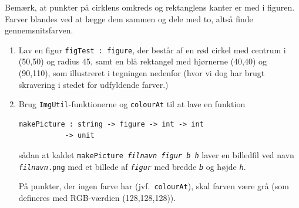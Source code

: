 \documentclass[a4paper,12pt]{article}
\begin{document}
\begin{enumerate}[label=8ø.\arabic*,start=0]
\noindent
Bemærk, at punkter på cirklens omkreds og rektanglens kanter er med i
figuren.  Farver blandes ved at lægge dem sammen og dele med to, altså
finde gennemsnitsfarven.

\begin{enumerate}[label=7ø.\arabic*,start=7]

\item Lav en figur \texttt{figTest : figure}, der består af en rød cirkel
  med centrum i (50,50) og radius 45, samt en blå rektangel med
  hjørnerne (40,40) og (90,110), som illustreret i tegningen nedenfor (hvor vi dog har brugt skravering i stedet for udfyldende farver.)
  \begin{center}
    \begin{minipage}{.23\textwidth}
    \end{minipage}
  \end{center}

\item Brug \texttt{ImgUtil}-funktionerne og \texttt{colourAt} til at lave en
  funktion

  \vspace{-4mm}
\begin{verbatim}
makePicture : string -> figure -> int -> int
           -> unit
\end{verbatim}
  \vspace{-4mm}
  
  \noindent
  sådan at kaldet \texttt{makePicture \emph{filnavn figur b h}} laver en
  billedfil ved navn \texttt{\emph{filnavn}.png} med et billede af
  \texttt{\emph{figur}} med bredde \texttt{\emph{b}} og højde
  \texttt{\emph{h}}.
  
  På punkter, der ingen farve har (jvf.\ \texttt{colourAt}), skal farven
  være grå (som defineres med RGB-værdien (128,128,128)).
  

\end{enumerate}
\end{enumerate}
\end{document}
